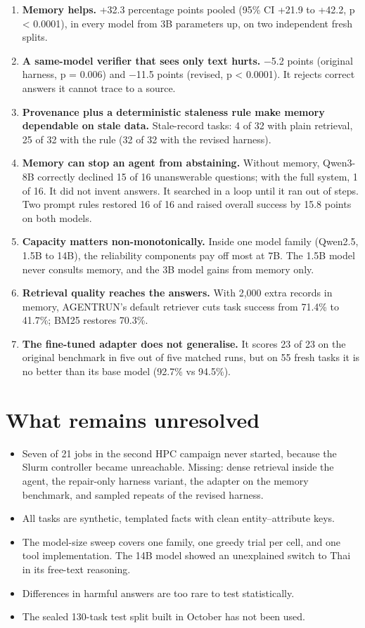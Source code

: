 \documentclass[10.5pt,a4paper,oneside]{report}
\begin{document}
\begin{enumerate}
\item \textbf{Memory helps.} +32.3 percentage points pooled (95\% CI +21.9 to +42.2, p < 0.0001), in every model from 3B parameters up, on two independent fresh splits.
\item \textbf{A same-model verifier that sees only text hurts.} −5.2 points (original harness, p = 0.006) and −11.5 points (revised, p < 0.0001). It rejects correct answers it cannot trace to a source.
\item \textbf{Provenance plus a deterministic staleness rule make memory dependable on stale data.} Stale-record tasks: 4 of 32 with plain retrieval, 25 of 32 with the rule (32 of 32 with the revised harness).
\item \textbf{Memory can stop an agent from abstaining.} Without memory, Qwen3-8B correctly declined 15 of 16 unanswerable questions; with the full system, 1 of 16. It did not invent answers. It searched in a loop until it ran out of steps. Two prompt rules restored 16 of 16 and raised overall success by 15.8 points on both models.
\item \textbf{Capacity matters non-monotonically.} Inside one model family (Qwen2.5, 1.5B to 14B), the reliability components pay off most at 7B. The 1.5B model never consults memory, and the 3B model gains from memory only.
\item \textbf{Retrieval quality reaches the answers.} With 2,000 extra records in memory, AGENTRUN's default retriever cuts task success from 71.4\% to 41.7\%; BM25 restores 70.3\%.
\item \textbf{The fine-tuned adapter does not generalise.} It scores 23 of 23 on the original benchmark in five out of five matched runs, but on 55 fresh tasks it is no better than its base model (92.7\% vs 94.5\%).
\end{enumerate}
\section{What remains unresolved}
\begin{itemize}
\item Seven of 21 jobs in the second HPC campaign never started, because the Slurm controller became unreachable. Missing: dense retrieval inside the agent, the repair-only harness variant, the adapter on the memory benchmark, and sampled repeats of the revised harness.
\item All tasks are synthetic, templated facts with clean entity–attribute keys.
\item The model-size sweep covers one family, one greedy trial per cell, and one tool implementation. The 14B model showed an unexplained switch to Thai in its free-text reasoning.
\item Differences in harmful answers are too rare to test statistically.
\item The sealed 130-task test split built in October has not been used.
\end{itemize}
\clearpage
\end{document}
